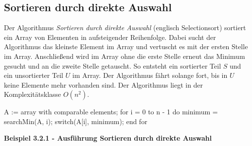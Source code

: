\subsection{Sortieren durch direkte Auswahl}

Der Algorithmus \textit{Sortieren durch direkte Auswahl} (englisch Selectionsort) sortiert ein Array von Elementen in aufsteigender Reihenfolge. Dabei sucht der Algorithmus das kleinste Element im Array und vertuscht es mit der ersten Stelle im Array. Anschließend wird im Array ohne die erste Stelle erneut das Minimum gesucht und an die zweite Stelle getauscht. So entsteht ein sortierter Teil $S$ und ein unsortierter Teil $U$ im Array. Der Algorithmus fährt solange fort, bis in $U$ keine Elemente mehr vorhanden sind. Der Algorithmus liegt in der Komplexitätsklasse $O(n^2)$.

\begin{PseudoCode}
A := array with comparable elements;
for i = 0 to n - 1 do
	minimum = searchMin(A, i);
	switch(A[i], minimum);
end for
\end{PseudoCode}

\noindent
\textbf{Beispiel 3.2.1 - Ausführung Sortieren durch direkte Auswahl}

